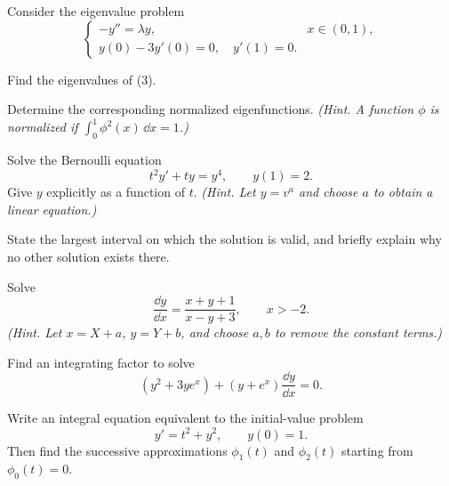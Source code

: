 \documentclass[11pt,oneside]{article}
\begin{document}
\begin{problem}
Consider the eigenvalue problem
\[
\begin{cases}
-y''=\lambda y,&x\in(0,1),\\
y(0)-3y'(0)=0,\quad y'(1)=0.
\end{cases}\tag{3}
\]
\begin{problemsubparts}
\item Find the eigenvalues of (3).
\item Determine the corresponding normalized eigenfunctions. \textit{(Hint. A function $\phi$ is normalized if $\int_0^1\phi^2(x)\,\dd x=1$.)}
\end{problemsubparts}
\end{problem}

\begin{problem}
\begin{problemsubparts}
\item Solve the Bernoulli equation
\[
t^2y'+ty=y^4,\qquad y(1)=2.
\]
Give $y$ explicitly as a function of $t$. \textit{(Hint. Let $y=v^a$ and choose $a$ to obtain a linear equation.)}
\item State the largest interval on which the solution is valid, and briefly explain why no other solution exists there.
\end{problemsubparts}
\end{problem}

\begin{problem}
Solve
\[
\frac{\dd y}{\dd x}=\frac{x+y+1}{x-y+3},\qquad x>-2.
\]
\textit{(Hint. Let $x=X+a$, $y=Y+b$, and choose $a,b$ to remove the constant terms.)}
\end{problem}

\begin{problem}
Find an integrating factor to solve
\[
(y^2+3ye^x)+(y+e^x)\frac{\dd y}{\dd x}=0.
\]
\end{problem}

\begin{problem}
Write an integral equation equivalent to the initial-value problem
\[
y'=t^2+y^2,\qquad y(0)=1.
\]
Then find the successive approximations $\phi_1(t)$ and $\phi_2(t)$ starting from $\phi_0(t)=0$.
\end{problem}
\end{document}
